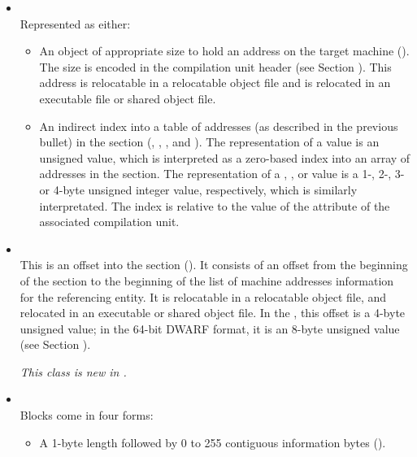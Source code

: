 \begin{itemize}

\item \CLASSaddress \\
Represented as either:
\begin{itemize}
\item An object of appropriate size to hold an
address on the target machine (\DWFORMaddrTARG). 
The size is encoded in the compilation unit header 
(see Section ).
This address is relocatable in a relocatable object file and
is relocated in an executable file or shared object file.

\item An indirect index into a table of addresses (as 
described in the previous bullet) in the \dotdebugaddr{} section 
\bb
(\DWFORMaddrxTARG, \DWFORMaddrxoneTARG, \DWFORMaddrxtwoTARG, 
\DWFORMaddrxthreeTARG{} and \DWFORMaddrxfourTARG). 
\eb 
The representation of a \DWFORMaddrxNAME{} value is an unsigned
 value, which is interpreted as a zero-based 
index into an array of addresses in the \dotdebugaddr{} section.
\bb
The representation of a \DWFORMaddrxoneNAME, \DWFORMaddrxtwoNAME, 
\DWFORMaddrxthreeNAME{} or \DWFORMaddrxfourNAME{} value is a 
1-, 2-, 3- or 4-byte unsigned integer value, respectively,
which is similarly interpretated.
\eb
The index is relative to the value of the \DWATaddrbase{} attribute 
of the associated compilation unit.

\end{itemize}

\item \CLASSaddrptr \\
This is an offset into the \dotdebugaddr{} section (\DWFORMsecoffset). It
consists of an offset from the beginning of the \dotdebugaddr{} section to the
beginning of the list of machine addresses information for the
referencing entity. It is relocatable in
a relocatable object file, and relocated in an executable or
shared object file. In the \thirtytwobitdwarfformat, this offset
is a 4-byte unsigned value; in the 64-bit DWARF
format, it is an 8-byte unsigned value (see Section
).

\textit{This class is new in \DWARFVersionV.}

\item \CLASSblock \\
Blocks come in four forms:
\begin{itemize}
\item
A 1-byte length followed by 0 to 255 contiguous information
bytes (\DWFORMblockoneTARG).


\end{itemize}
\end{itemize}
